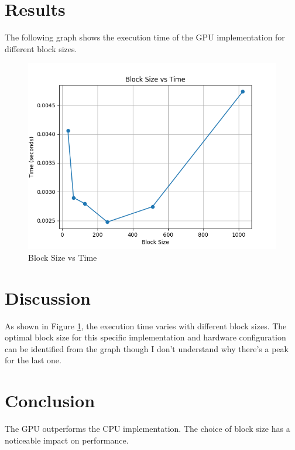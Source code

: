 \documentclass{article}
\begin{document}
\section{Results}
The following graph shows the execution time of the GPU implementation for different block sizes.

\begin{figure}[h]
    \centering
    \includegraphics[width=\linewidth]{block_size_vs_time.png}
    \caption{Block Size vs Time}
    \label{fig:block_size_vs_time}
\end{figure}

\section{Discussion}
As shown in Figure \ref{fig:block_size_vs_time}, the execution time varies with different block sizes. The optimal block size for this specific implementation and hardware configuration can be identified from the graph though I don't understand why there's a peak for the last one.

\section{Conclusion}
The GPU outperforms the CPU implementation. The choice of block size has a noticeable impact on performance.
\end{document}
